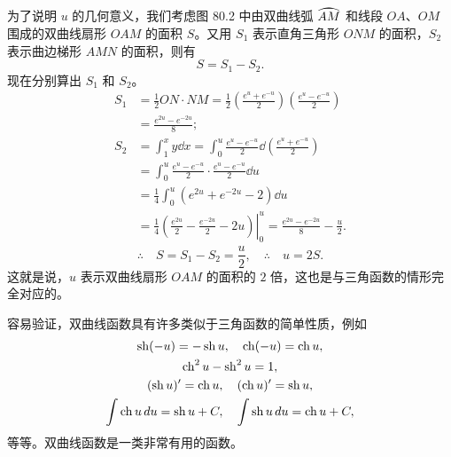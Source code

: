 为了说明 $u$ 的几何意义，我们考虑图 80.2 中由双曲线弧 $\arc{AM}$ 和线段 $OA$、$OM$ 围成的双曲线扇形 $OAM$ 的面积 $S$。又用 $S_1$ 表示直角三角形 $ONM$ 的面积，$S_2$ 表示曲边梯形 $AMN$ 的面积，则有
\[
  S = S_1 - S_2.
\]
现在分别算出 $S_1$ 和 $S_2$。
\begin{align*}
  S_1 &= \frac{1}{2}ON\cdot NM = \frac{1}{2}\left(\frac{e^u+e^{-u}}{2}\right)\left(\frac{e^u-e^{-u}}{2}\right) \\
      &= \frac{e^{2u}-e^{-2u}}{8}; \\
  S_2 &= \int_1^x y\dd x = \int_0^u \frac{e^u-e^{-u}}{2}\dd\left(\frac{e^u+e^{-u}}{2}\right) \\
      &= \int_0^u \frac{e^u-e^{-u}}{2}\cdot\frac{e^u-e^{-u}}{2}\dd u \\
      &= \frac{1}{4}\int_0^u (e^{2u}+e^{-2u}-2)\dd u \\
      &= \left.\frac{1}{4}\left(\frac{e^{2u}}{2}-\frac{e^{-2u}}{2}-2u\right)\right|_0^u = \frac{e^{2u}-e^{-2u}}{8} - \frac{u}{2}.
\end{align*}
\[
  \therefore\quad S = S_1 - S_2 = \frac{u}{2},\quad \therefore\quad u = 2S.
\]
这就是说，$u$ 表示双曲线扇形 $OAM$ 的面积的 $2$ 倍，这也是与三角函数的情形完全对应的。

容易验证，双曲线函数具有许多类似于三角函数的简单性质，例如
\begin{gather*}
  \operatorname{sh}(-u) = -\operatorname{sh} u,\quad \operatorname{ch}(-u) = \operatorname{ch} u, \\
  \operatorname{ch}^2 u - \operatorname{sh}^2 u = 1, \\
  (\operatorname{sh} u)' = \operatorname{ch} u,\quad (\operatorname{ch} u)' = \operatorname{sh} u, \\
  \int\operatorname{ch} u\,d u = \operatorname{sh} u + C,\quad \int\operatorname{sh} u\,d u = \operatorname{ch} u + C,
\end{gather*}
等等。双曲线函数是一类非常有用的函数。

